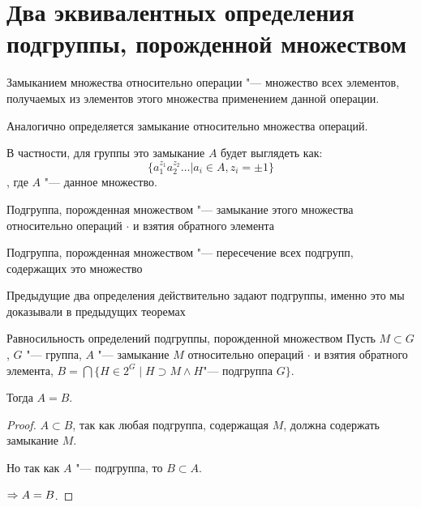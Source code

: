 \section{Два эквивалентных определения подгруппы, порожденной множеством}
\begin{Def}
	Замыканием множества относительно операции "--- множество всех элементов, получаемых из элементов этого множества применением данной операции.

	Аналогично определяется замыкание относительно множества операций.
\end{Def}

В частности, для группы это замыкание $A$ будет выглядеть как: \[\{a_1^{z_1}a_2^{z_2}\dots | a_i \in A, z_i = \pm 1 \}\], где $A$ "--- данное множество.

\begin{Def}
	Подгруппа, порожденная множеством "--- замыкание этого множества относительно операций $\cdot$ и взятия обратного элемента
\end{Def}

\begin{Def}
	Подгруппа, порожденная множеством "--- пересечение всех подгрупп, содержащих это множество 
\end{Def}

\begin{Rem}
	Предыдущие два определения действительно задают подгруппы, именно это мы доказывали в предыдущих теоремах 
\end{Rem}

\begin{theorem} {Равносильность определений подгруппы, порожденной множеством}
	Пусть $M \subset G$, $G$ "--- группа, $A$ "--- замыкание $M$ относительно операций $\cdot$ и взятия обратного элемента,
    $B = \bigcap \{ H \in 2^G \mid H \supset M \land H \text{"--- подгруппа } G\}$.

	Тогда $A = B$.
\end{theorem}
\begin{proof}
	$A \subset B$, так как любая подгруппа, содержащая $M$, должна содержать замыкание $M$.

	Но так как $A$ "--- подгруппа, то $B \subset A$.

	$\Rightarrow A = B$.
\end{proof}
